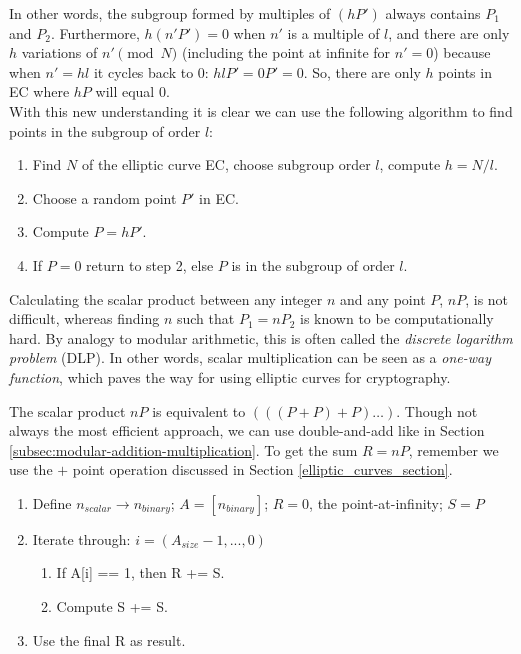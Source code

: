 In other words, the subgroup formed by multiples of $(h P')$ always contains $P_1$ and $P_2$. Furthermore, $h(n' P')=0$ when $n'$ is a multiple of $l$, and there are only $h$ variations of $n' \pmod N$ (including the point at infinite for $n' = 0$) because when $n' = h l$ it cycles back to 0: $h l P' = 0P' = 0$. So, there are only $h$ points in EC where $h P$ will equal 0.
\\ \newline
With this new understanding it is clear we can use the following algorithm to find points in the subgroup of order $l$:
\begin{enumerate}
    \item Find $N$ of the elliptic curve EC, choose subgroup order $l$, compute $h=N/l$.
    \item Choose a random point $P'$ in EC.
    \item Compute $P=h P'$.
    \item If $P=0$ return to step 2, else $P$ is in the subgroup of order $l$.
\end{enumerate}

Calculating the scalar product between any integer $n$ and any point $P$, $nP$, is not difficult, whereas finding $n$ such that $P_1 = n P_2$ is known to be computationally hard. By analogy to modular arithmetic, this is often called the {\em discrete logarithm problem} (DLP). In other words, scalar multiplication can be seen as a {\em one-way function}, which paves the way for using elliptic curves for cryptography.

The scalar product $nP$ is equivalent to $(((P+P)+P)…)$. Though not always the most efficient approach, we can use double-and-add like in Section \ref{subsec:modular-addition-multiplication}. To get the sum $R = n P$, remember we use the $+$ point operation discussed in Section \ref{elliptic_curves_section}.

\begin{enumerate}
	\item Define $n_{scalar} \rightarrow n_{binary}$; $A = [n_{binary}]$; $R = 0$, the point-at-infinity; $S = P$
	\item Iterate through: $i = (A_{size} - 1,...,0)$
	\begin{enumerate}
		\item If A[i] == 1, then R += S.
		\item Compute S += S.
	\end{enumerate}
	\item Use the final R as result.
\end{enumerate}


